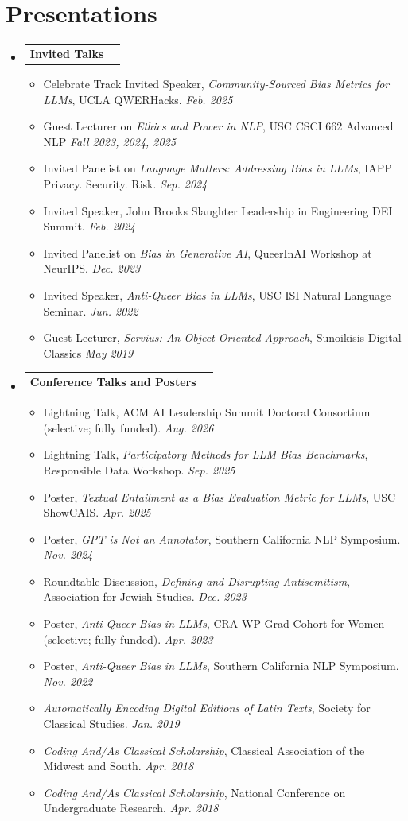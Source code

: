 \documentclass[letterpaper,11pt]{article}
\makeatletter
\newcommand{\resumeItem}[1]{
  \item\small{
  {#1 \vspace{-2pt}}
  }
}
\newcommand{\resumeSubheadingNoTitle}[1]{
  \vspace{-1pt} \item
    \begin{tabular*}{0.97\textwidth}{l@{\extracolsep{\fill}}r}
      \textbf{#1} & \\
    \end{tabular*}\vspace{-5pt}
}
\newcommand{\resumeSubHeadingListStart}{\begin{itemize}[label={}, leftmargin=*]}
\newcommand{\resumeSubHeadingListEnd}{\end{itemize}}
\newcommand{\resumeItemListStart}{\begin{itemize}}
\newcommand{\resumeItemListEnd}{\end{itemize}\vspace{-5pt}}
\makeatother
\begin{document}
\section{Presentations}
\resumeSubHeadingListStart
 \resumeSubheadingNoTitle{Invited Talks}
      \resumeItemListStart
      \resumeItem{Celebrate Track Invited Speaker, \textit{Community-Sourced Bias Metrics for LLMs}, UCLA QWERHacks. \hfill \textit{Feb. 2025}}
      \resumeItem{Guest Lecturer on \textit{Ethics and Power in NLP}, USC CSCI 662 Advanced NLP \hfill \textit{Fall 2023, 2024, 2025}}
      \resumeItem{Invited Panelist on \textit{Language Matters: Addressing Bias in LLMs}, IAPP Privacy. Security. Risk. \hfill \textit{Sep. 2024}}
      \resumeItem{Invited Speaker, John Brooks Slaughter Leadership in Engineering DEI Summit. \hfill \textit{Feb. 2024}}
      \resumeItem{Invited Panelist on \textit{Bias in Generative AI}, QueerInAI Workshop at NeurIPS. \hfill \textit{Dec. 2023}}
    \resumeItem{Invited Speaker, \textit{Anti-Queer Bias in LLMs}, USC ISI Natural Language Seminar. \hfill \textit{Jun. 2022}}
    \resumeItem{Guest Lecturer, \textit{Servius: An Object-Oriented Approach}, Sunoikisis Digital Classics \hfill \textit{May 2019}}
      \resumeItemListEnd
    \resumeSubheadingNoTitle{Conference Talks and Posters}
      \resumeItemListStart
      \resumeItem{Lightning Talk, ACM AI Leadership Summit  Doctoral Consortium (selective; fully funded). \hfill \textit{Aug. 2026}}
      \resumeItem{Lightning Talk, \textit{Participatory Methods for LLM Bias Benchmarks}, Responsible Data Workshop. \hfill \textit{Sep. 2025}}
      \resumeItem{Poster, \textit{Textual Entailment as a Bias Evaluation Metric for LLMs}, USC ShowCAIS. \hfill \textit{Apr. 2025}}
      \resumeItem{Poster, \textit{GPT is Not an Annotator}, Southern California NLP Symposium. \hfill \textit{Nov. 2024}}
      \resumeItem{Roundtable Discussion, \textit{Defining and Disrupting Antisemitism}, Association for Jewish Studies. \hfill \textit{Dec. 2023}}
      \resumeItem{Poster, \textit{Anti-Queer Bias in LLMs}, CRA-WP Grad Cohort for Women (selective; fully funded). \hfill \textit{Apr. 2023}}
      \resumeItem{Poster, \textit{Anti-Queer Bias in LLMs}, Southern California NLP Symposium. \hfill \textit{Nov. 2022}}
      \resumeItem{\textit{Automatically Encoding Digital Editions of Latin Texts}, Society for Classical Studies. \hfill \textit{Jan. 2019}}
      \resumeItem{\textit{Coding And/As Classical Scholarship}, Classical Association of the Midwest and South. \hfill \textit{Apr. 2018}}
      \resumeItem{\textit{Coding And/As Classical Scholarship}, National Conference on Undergraduate Research. \hfill \textit{Apr. 2018}}
      \resumeItemListEnd
    \resumeSubHeadingListEnd
\end{document}
